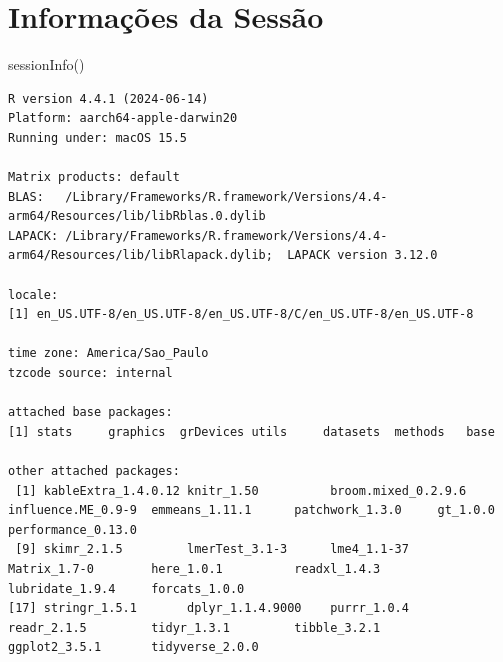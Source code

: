\documentclass[
  12pt,
]{article}
\newenvironment{Shaded}{\begin{snugshade}}{\end{snugshade}}
\newcommand{\FunctionTok}[1]{\textcolor[rgb]{0.28,0.35,0.67}{#1}}
\newcommand{\NormalTok}[1]{\textcolor[rgb]{0.00,0.23,0.31}{#1}}
\begin{document}
\section{Informações da Sessão}\label{informauxe7uxf5es-da-sessuxe3o}

\begin{Shaded}
\begin{Highlighting}[]
\FunctionTok{sessionInfo}\NormalTok{()}
\end{Highlighting}
\end{Shaded}

\begin{verbatim}
R version 4.4.1 (2024-06-14)
Platform: aarch64-apple-darwin20
Running under: macOS 15.5

Matrix products: default
BLAS:   /Library/Frameworks/R.framework/Versions/4.4-arm64/Resources/lib/libRblas.0.dylib 
LAPACK: /Library/Frameworks/R.framework/Versions/4.4-arm64/Resources/lib/libRlapack.dylib;  LAPACK version 3.12.0

locale:
[1] en_US.UTF-8/en_US.UTF-8/en_US.UTF-8/C/en_US.UTF-8/en_US.UTF-8

time zone: America/Sao_Paulo
tzcode source: internal

attached base packages:
[1] stats     graphics  grDevices utils     datasets  methods   base     

other attached packages:
 [1] kableExtra_1.4.0.12 knitr_1.50          broom.mixed_0.2.9.6 influence.ME_0.9-9  emmeans_1.11.1      patchwork_1.3.0     gt_1.0.0            performance_0.13.0 
 [9] skimr_2.1.5         lmerTest_3.1-3      lme4_1.1-37         Matrix_1.7-0        here_1.0.1          readxl_1.4.3        lubridate_1.9.4     forcats_1.0.0      
[17] stringr_1.5.1       dplyr_1.1.4.9000    purrr_1.0.4         readr_2.1.5         tidyr_1.3.1         tibble_3.2.1        ggplot2_3.5.1       tidyverse_2.0.0    


\end{verbatim}
\end{document}
